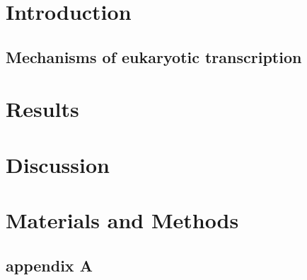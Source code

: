 \documentclass[draft]{Thesis}
\begin{document}
\listoftodos
\frontmatter


\part{Introduction}
\chapter{Mechanisms of eukaryotic transcription}
\blindtext[2]
\blindtext[4]

\blindtext

\part{Results}



\part{Discussion}

\part{Materials and Methods}
\appendix
\chapter{appendix A}
\blindtext[4]

\singlespacing


\end{document}
